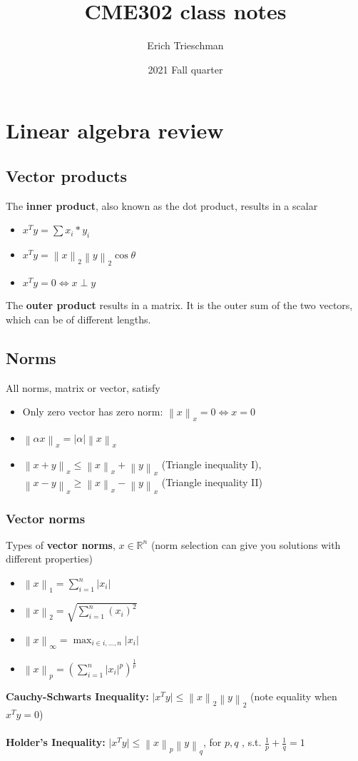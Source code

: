 \documentclass{article}
\title{CME302 class notes}
\author{Erich Trieschman}
\date{2021 Fall quarter}
\newcommand{\norm}[2]{\left\lVert#1\right\rVert_#2}
\newcommand{\abs}[1]{\lvert#1\rvert}
\begin{document}
\maketitle

\section{Linear algebra review}

\subsection{Vector products}
The \textbf{inner product}, also known as the dot product, results in a scalar
\begin{itemize}
    \item $x^Ty = \sum x_i*y_i$
    \item $x^Ty = \norm{x}{2}\norm{y}{2}\cos\theta$
    \item $x^Ty = 0 \Leftrightarrow x \perp y$
\end{itemize}
The \textbf{outer product} results in a matrix. It is the outer sum of the two vectors, which can be of different lengths.

\subsection{Norms}
All norms, matrix or vector, satisfy
\begin{itemize}
    \item Only zero vector has zero norm: $\norm{x}{x} = 0 \Leftrightarrow x = 0$
    \item $\norm{\alpha x}{x} = \abs{\alpha}\norm{x}{x}$
    \item $\norm{x+y}{x} \leq \norm{x}{x} + \norm{y}{x}$ (Triangle inequality I), $\norm{x-y}{x} \geq \norm{x}{x} - \norm{y}{x}$ (Triangle inequality II)
\end{itemize}

\subsubsection{Vector norms}
Types of \textbf{vector norms}, $x \in \mathbb{R}^{n}$ (norm selection can give you solutions with different properties)
\begin{itemize}
    \item $\norm{x}{1} = \sum_{i=1}^n \abs{x_i}$
    \item $\norm{x}{2} = \sqrt{\sum_{i=1}^n (x_i)^2}$
    \item $\norm{x}{\infty} = \max_{i \in i,\dots, n} \abs{x_i}$
    \item $\norm{x}{p} = (\sum_{i=1}^n \abs{x_i}^p)^{\frac{1}{p}}$
\end{itemize}
\textbf{Cauchy-Schwarts Inequality:} $\abs{x^Ty}\leq \norm{x}{2}\norm{y}{2}$ (note equality when $x^Ty = 0$)\\ \\
\textbf{Holder's Inequality:} $\abs{x^Ty} \leq \norm{x}{p}\norm{y}{q}$, for $p, q$ , s.t. $\frac{1}{p} + \frac{1}{q} = 1$
\end{document}

